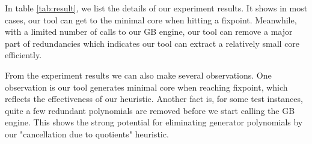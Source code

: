In table \ref{tab:result}, we list the details of our experiment results. It shows in most cases, our tool
can get to the minimal core when hitting a fixpoint. Meanwhile, with a limited number of calls to our GB
engine, our tool can remove a major part of redundancies which indicates our tool
can extract a relatively small core efficiently.

From the experiment results we can also make several observations. One observation is our tool generates
minimal core when reaching fixpoint, which reflects the effectiveness of our heuristic. Another fact is,
for some test instances, quite a few redundant polynomials are removed before we start calling
the GB engine. This shows the strong potential for eliminating generator polynomials by our
"cancellation due to quotients" heuristic.
